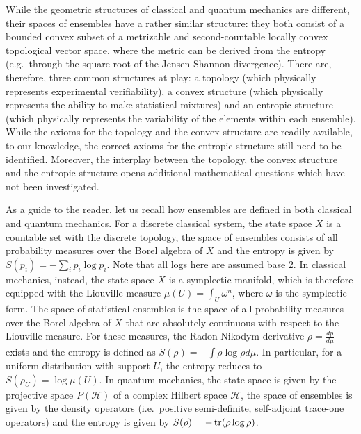 While the geometric structures of classical and quantum mechanics are different, their spaces of ensembles have a rather similar structure: they both consist of a bounded convex subset of a metrizable and second-countable locally convex topological vector space, where the metric can be derived from the entropy (e.g.~through the square root of the Jensen-Shannon divergence). There are, therefore, three common structures at play: a topology (which physically represents experimental verifiability), a convex structure (which physically represents the ability to make statistical mixtures) and an entropic structure (which physically represents the variability of the elements within each ensemble). While the axioms for the topology and the convex structure are readily available, to our knowledge, the correct axioms for the entropic structure still need to be identified. Moreover, the interplay between the topology, the convex structure and the entropic structure opens additional mathematical questions which have not been investigated.

As a guide to the reader, let us recall how ensembles are defined in both classical and quantum mechanics. For a discrete classical system, the state space $X$ is a countable set with the discrete topology, the space of ensembles consists of all probability measures over the Borel algebra of $X$ and the entropy is given by $S(p_i) = - \sum_i p_i \log p_i$. Note that all logs here are assumed base 2. In classical mechanics, instead, the state space $X$ is a symplectic manifold, which is therefore equipped with the  Liouville measure $\mu(U) = \int_U \omega^n$, where $\omega$ is the symplectic form. The space of statistical ensembles is the space of all probability measures over the Borel algebra of $X$ that are absolutely continuous with respect to the Liouville measure. For these measures, the Radon-Nikodym derivative $\rho = \frac{dp}{d\mu}$ exists and the entropy is defined as $S(\rho) = - \int \rho \log \rho d\mu$. In particular, for a uniform distribution with support $U$, the entropy reduces to $S(\rho_U) = \log \mu(U)$. In quantum mechanics, the state space is given by the projective space $P(\mathcal{H})$ of a complex Hilbert space $\mathcal{H}$, the space of ensembles is given by the density operators (i.e.~positive semi-definite, self-adjoint trace-one operators) and the entropy is given by $S(\rho) = -\operatorname{tr}(\rho \log \rho)$.

